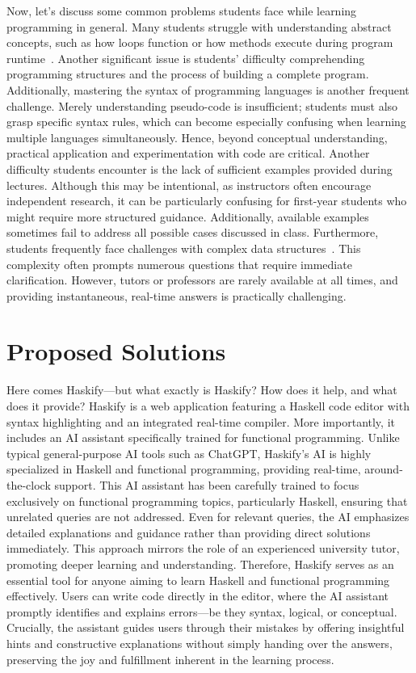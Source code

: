 Now, let's discuss some common problems students face while learning programming in general. Many students struggle with understanding abstract concepts, such as how loops function or how methods execute during program runtime~\cite{derus2012difficulties}. Another significant issue is students' difficulty comprehending programming structures and the process of building a complete program. Additionally, mastering the syntax of programming languages is another frequent challenge. Merely understanding pseudo-code is insufficient; students must also grasp specific syntax rules, which can become especially confusing when learning multiple languages simultaneously. Hence, beyond conceptual understanding, practical application and experimentation with code are critical.
Another difficulty students encounter is the lack of sufficient examples provided during lectures. Although this may be intentional, as instructors often encourage independent research, it can be particularly confusing for first-year students who might require more structured guidance. Additionally, available examples sometimes fail to address all possible cases discussed in class. Furthermore, students frequently face challenges with complex data structures~\cite{milne2002difficulties}. This complexity often prompts numerous questions that require immediate clarification. However, tutors or professors are rarely available at all times, and providing instantaneous, real-time answers is practically challenging.

\section{Proposed Solutions}

Here comes Haskify—but what exactly is Haskify? How does it help, and what does it provide? Haskify is a web application featuring a Haskell code editor with syntax highlighting and an integrated real-time compiler. More importantly, it includes an AI assistant specifically trained for functional programming. Unlike typical general-purpose AI tools such as ChatGPT, Haskify's AI is highly specialized in Haskell and functional programming, providing real-time, around-the-clock support.
This AI assistant has been carefully trained to focus exclusively on functional programming topics, particularly Haskell, ensuring that unrelated queries are not addressed. Even for relevant queries, the AI emphasizes detailed explanations and guidance rather than providing direct solutions immediately. This approach mirrors the role of an experienced university tutor, promoting deeper learning and understanding.
Therefore, Haskify serves as an essential tool for anyone aiming to learn Haskell and functional programming effectively. Users can write code directly in the editor, where the AI assistant promptly identifies and explains errors—be they syntax, logical, or conceptual. Crucially, the assistant guides users through their mistakes by offering insightful hints and constructive explanations without simply handing over the answers, preserving the joy and fulfillment inherent in the learning process.



